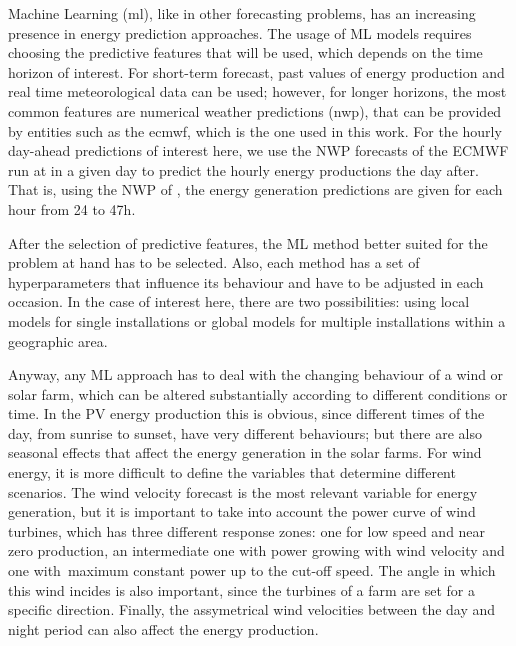 Machine Learning (\acrshort{ml}), like in other forecasting problems, has an increasing presence in energy prediction approaches. 
The usage of ML models requires choosing the predictive features that will be used, which depends on the time horizon of interest. 
For short-term forecast, past values of energy production and real time meteorological data can be used; however, for longer horizons, the most common features are numerical weather predictions (\acrshort{nwp}), that can be provided by entities such as the \acrlong{ecmwf}, which is the one used in this work.
For the hourly day-ahead predictions of interest here, we use the NWP forecasts of the ECMWF run at  in a given day to predict the hourly energy productions the day after. That is, using the NWP of , the energy generation predictions are given for each hour from {24} to {47}h.

After the selection of predictive features, the ML method better suited for the problem at hand has to be selected. Also, each method has a set of hyperparameters that influence its behaviour and have to be adjusted in each occasion.
In the case of interest here, there are two possibilities: using local models for single installations or global models for multiple installations within a geographic area.


Anyway, any ML approach has to deal with the changing behaviour of a wind or solar farm, which can be altered substantially according to different conditions or time.
In the PV energy production this is obvious, since different times of the day, from sunrise to sunset, have very different behaviours; but there are also seasonal effects that affect the energy generation in the solar farms.
For wind energy, it is more difficult to define the variables that determine different scenarios. 
The wind velocity forecast is the most relevant variable for energy generation, but it is important to take into account the power curve of wind turbines, which has three different response zones: one for low speed and near zero production, an intermediate one with power growing with wind velocity and one with~maximum constant power up to the cut-off speed.
The angle in which this wind incides is also important, since the turbines of a farm are set for a specific direction. 
Finally, the assymetrical wind velocities between the day and night period can also affect the energy production.

